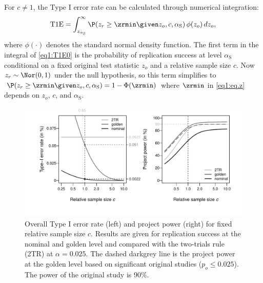 For $c \neq 1$, the Type I error rate can be calculated through numerical
integration:
\begin{equation}\label{eq1:T1E0}
  \mbox{T1E} = \int_{z_{\alpha_{\mathrm{S}}}}^{\infty}
\P(z_r \geq \zrmin \given z_o, c, \alpha_{\mathrm{S}}) \,
  \phi(z_o) \, dz_o,
\end{equation}
where $\phi(\cdot)$ denotes the standard normal density function. The first term
in the integral of \eqref{eq1:T1E0} is the probability of replication success at
level $\alpha_{\mathrm{S}}$ conditional on a fixed original test statistic $z_o$ and a
relative sample size $c$. Now $z_r \sim \Nor(0,1)$ under the null hypothesis, so
this term simplifies to
$\P(z_r \geq \zrmin \given z_o, c, \alpha_{\mathrm{S}}) = 1 - \Phi(\zrmin)$ where $\zrmin$
in \eqref{eq1:eq.z} depends on $z_o$, $c$, and $\alpha_{\mathrm{S}}$.


\begin{figure}[!h]
\centering

\begin{knitrout}
\color{fgcolor}

{\centering \includegraphics[width=\maxwidth]{images/paper1/fig4-1}

}

\end{knitrout}

\caption{Overall Type I error rate (left) and project power (right) for fixed
  relative sample size $c$. Results are given for replication success at the
  nominal and golden level and compared with the two-trials rule (2TR) at
  $\alpha = 0.025$. The dashed darkgrey line is the project power at the golden
  level based on significant original studies ($p_o \leq 0.025$). The power of
  the original study is 90\%.}
\label{fig1:fig4}
\end{figure}


